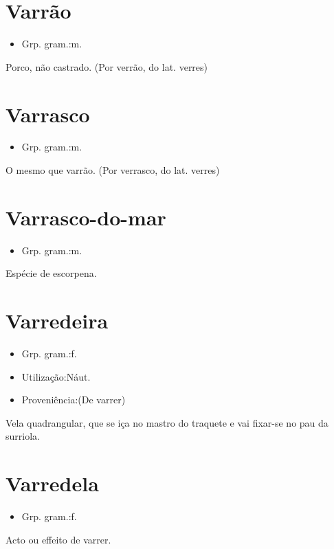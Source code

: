 \documentclass{article}
\begin{document}
\section{Varrão}
\begin{itemize}
\item {Grp. gram.:m.}
\end{itemize}
Porco, não castrado.
(Por \textunderscore verrão\textunderscore , do lat. \textunderscore verres\textunderscore )
\section{Varrasco}
\begin{itemize}
\item {Grp. gram.:m.}
\end{itemize}
O mesmo que \textunderscore varrão\textunderscore .
(Por \textunderscore verrasco\textunderscore , do lat. \textunderscore verres\textunderscore )
\section{Varrasco-do-mar}
\begin{itemize}
\item {Grp. gram.:m.}
\end{itemize}
Espécie de escorpena.
\section{Varredeira}
\begin{itemize}
\item {Grp. gram.:f.}
\end{itemize}
\begin{itemize}
\item {Utilização:Náut.}
\end{itemize}
\begin{itemize}
\item {Proveniência:(De \textunderscore varrer\textunderscore )}
\end{itemize}
Vela quadrangular, que se iça no mastro do traquete e vai fixar-se no pau da surriola.
\section{Varredela}
\begin{itemize}
\item {Grp. gram.:f.}
\end{itemize}
Acto ou effeito de varrer.
\end{document}
